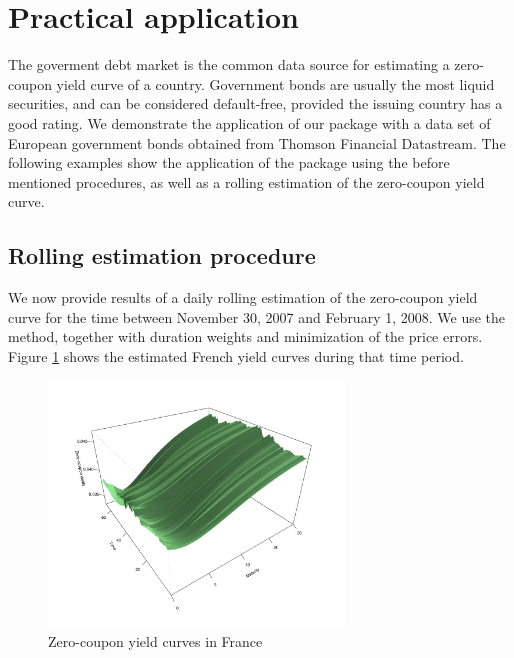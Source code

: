 \section{Practical application}
\label{sec:pract-appl}

The goverment debt market is the common data source for estimating a zero-coupon yield curve of a country. Government bonds are usually the most liquid securities, and can be considered default-free, provided the issuing country has a good rating. We demonstrate the application of our package with a data set of European government bonds obtained from Thomson Financial Datastream. The following examples show the application of the package using the before mentioned procedures, as well as a rolling estimation of the zero-coupon yield curve.




\subsection{Rolling estimation procedure}

We now provide results of a daily rolling estimation of the zero-coupon yield curve for the time between November 30, 2007 and February 1, 2008. We use the \cite{Svensson1994} method, together with duration weights and minimization of the price errors. Figure \ref{fig:3dplot} shows the estimated French yield curves during that time period.

\begin{figure}[htb]
  \begin{center}
  \caption{Zero-coupon yield curves in France}
  \label{fig:3dplot}
\includegraphics[width=0.7\textwidth]{3dplot}
\end{center}
\end{figure}

